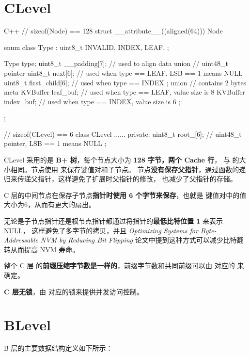 \documentclass{mydoc}
\begin{document}
\section{CLevel}

\begin{codes}{C++}
// sizeof(Node) == 128
struct __attribute__((aligned(64))) Node {
  enum class Type : uint8_t {
    INVALID,
    INDEX,
    LEAF,
  };

  Type type;
  uint8_t __padding[7]; // used to align data
  union {
    // uint48_t pointer
    uint8_t next[6];    // used when type == LEAF. LSB == 1 means NULL
    uint8_t first_child[6]; // used when type == INDEX
  };
  union {
    // contains 2 bytes meta
    KVBuffer leaf_buf;  // used when type == LEAF, value size is 8
    KVBuffer index_buf; // used when type == INDEX, value size is 6
  };
};

// sizeof(CLevel) == 6
class CLevel {
  ......
 private:
  uint8_t root_[6]; // uint48_t pointer, LSB == 1 means NULL
};
\end{codes}

CLevel 采用的是 \textbf{B+ 树}，每个节点大小为 \textbf{128 字节，两个 Cache 行}，
与  的大小相同。节点使用  来保存键值对和子节点。
节点\textbf{没有保存父指针}，通过函数的递归来传递父指针，这样避免了扩展时父指针的修改，
也减少了父指针的存储。

C 层的中间节点在保存子节点\textbf{指针时使用 6 个字节来保存}，也就是 
键值对中的值大小为6，从而有更大的扇出。

无论是子节点指针还是根节点指针都通过将指针的\textbf{最低比特位置 1} 来表示 NULL，
这样避免了多字节的拷贝，并且 \emph{Optimizing Systems for Byte-Addressable NVM
by Reducing Bit Flipping} 论文中提到这种方式可以减少比特翻转从而提高 NVM 寿命。

整个 C 层  的\textbf{前缀压缩字节数是一样的}，前缀字节数和共同前缀可以由
对应的  来确定。

\textbf{C 层无锁}，由  对应的锁来提供并发访问控制。

\section{BLevel}

B 层的主要数据结构定义如下所示：
\end{document}
